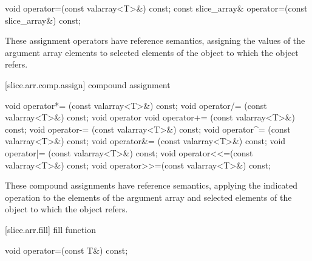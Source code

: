 %
\begin{itemdecl}
void operator=(const valarray<T>&) const;
const slice_array& operator=(const slice_array&) const;
\end{itemdecl}

\begin{itemdescr}
\pnum
These assignment operators have reference semantics,
assigning the values of the argument array elements to selected
elements of the
object to which the
object refers.
\end{itemdescr}

[slice.arr.comp.assign]{ compound assignment}

%
%
%
%
%
%
%
%
%
%
%
%
\begin{itemdecl}
void operator*= (const valarray<T>&) const;
void operator/= (const valarray<T>&) const;
void operator%
void operator+= (const valarray<T>&) const;
void operator-= (const valarray<T>&) const;
void operator^= (const valarray<T>&) const;
void operator&= (const valarray<T>&) const;
void operator|= (const valarray<T>&) const;
void operator<<=(const valarray<T>&) const;
void operator>>=(const valarray<T>&) const;
\end{itemdecl}

\begin{itemdescr}
\pnum
These compound assignments have reference semantics, applying the
indicated operation to the elements of the argument array
and selected elements of the
object to which the
object refers.
\end{itemdescr}

[slice.arr.fill]{ fill function}

%
\begin{itemdecl}
void operator=(const T&) const;
\end{itemdecl}

